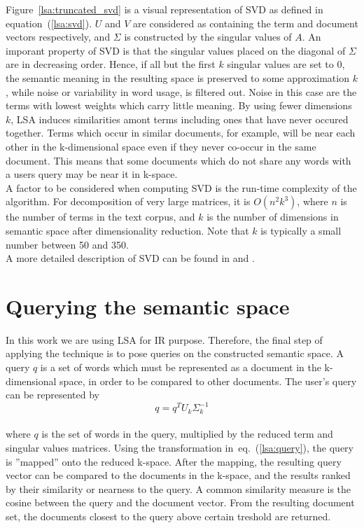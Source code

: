 Figure~\ref{lsa:truncated_svd} is a visual representation of \gls{SVD} as defined in equation~(\ref{lsa:svd}). $U$ and $V$ are considered as containing the term and document vectors respectively, and $\Sigma$ is constructed by the singular values of $A$. An imporant property of \gls{SVD} is that the singular values placed on the diagonal of $\Sigma$ are in decreasing order. Hence, if all but the first $k$ singular values are set to $0$, the semantic meaning in the resulting space is preserved to some approximation $k$, while noise or variability in word usage, is filtered out. Noise in this case are the terms with lowest weights which carry little meaning. By using fewer dimensions $k$, \gls{LSA} induces similarities amont terms including ones that have never occured together. Terms which occur in similar documents, for example, will be near each other in the k-dimensional space even if they never co-occur in the same document. This means that some documents which do not share any words with a users query may be near it in k-space.\\

A factor to be considered when computing \gls{SVD} is the run-time complexity of the algorithm. For decomposition of very large matrices, it is $O(n^2k^3)$, where $n$ is the number of terms in the text corpus, and $k$ is the number of dimensions in semantic space after dimensionality reduction. Note that $k$ is typically a small number between 50 and 350.\\

A more detailed description of \gls{SVD} can be found in \cite{Berry95usinglinear} and \cite{MatrixCompGolub96}.\\

\section{Querying the semantic space}
\label{lsa:querying_sspace}

In this work we are using \gls{LSA} for \gls{IR} purpose. Therefore, the final step of applying the technique is to pose queries on the constructed semantic space. A query $q$ is a set of words which must be represented as a document in the k-dimensional space, in order to be compared to other documents. The user's query can be represented by
%
%
\begin{equation}
\label{lsa:query}
q = q^{T}U_{k}\Sigma_{k}^{-1}
\end{equation}\\
where $q$ is the set of words in the query, multiplied by the reduced term and singular values matrices. Using the transformation in~eq.~(\ref{lsa:query}), the query is ''mapped'' onto the reduced k-space. After the mapping, the resulting query vector can be compared to the documents in the k-space, and the results ranked by their similarity or nearness to the query. A common similarity measure is the cosine between the query and the document vector. From the resulting document set, the documents closest to the query above certain treshold are returned. \\

